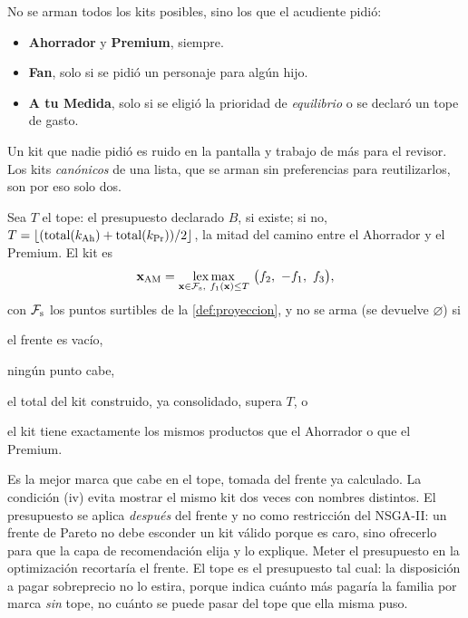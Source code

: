 No se arman todos los kits posibles, sino los que el acudiente pidió:
\begin{itemize}
  \item \textbf{Ahorrador} y \textbf{Premium}, siempre.
  \item \textbf{Fan}, solo si se pidió un personaje para algún hijo.
  \item \textbf{A tu Medida}, solo si se eligió la prioridad de
        \emph{equilibrio} o se declaró un tope de gasto.
\end{itemize}
Un kit que nadie pidió es ruido en la pantalla y trabajo de más para el
revisor. Los kits \emph{canónicos} de una lista, que se arman sin
preferencias para reutilizarlos, son por eso solo dos.

\begin{definicion}[A tu Medida]
\label{def:a-tu-medida}
Sea $T$ el tope: el presupuesto declarado $B$, si existe; si no,
$T=\left\lfloor (\mathrm{total}(k_{\mathrm{Ah}})+\mathrm{total}(k_{\mathrm{Pr}}))/2 \right\rfloor$, la
mitad del camino entre el Ahorrador y el Premium. El kit es
\[
  \mathbf{x}_{\mathrm{AM}}=\lexmax_{\mathbf{x}\in\Front_{\mathrm{s}},\ f_1(\mathbf{x})\leq T}\ \bigl(f_2,\ -f_1,\ f_3\bigr),
\]
con $\mathcal{F}_{\mathrm{s}}$ los puntos surtibles de la \cref{def:proyeccion},
y no se arma (se devuelve $\varnothing$) si
\begin{enumerate*}[label=(\roman*)]
  \item el frente es vacío,
  \item ningún punto cabe,
  \item el total del kit construido, ya consolidado, supera $T$, o
  \item el kit tiene exactamente los mismos productos que el Ahorrador o que
        el Premium.
\end{enumerate*}
\end{definicion}

Es la mejor marca que cabe en el tope, tomada del frente ya calculado. La
condición (iv) evita mostrar el mismo kit dos veces con nombres distintos. El
presupuesto se aplica \emph{después} del frente y no como restricción del
NSGA-II: un frente de Pareto no debe esconder un kit válido porque es caro,
sino ofrecerlo para que la capa de recomendación elija y lo explique. Meter el
presupuesto en la optimización recortaría el frente. El tope es el presupuesto
tal cual: la disposición a pagar sobreprecio no lo estira, porque indica
cuánto más pagaría la familia por marca \emph{sin} tope, no cuánto se puede
pasar del tope que ella misma puso.

